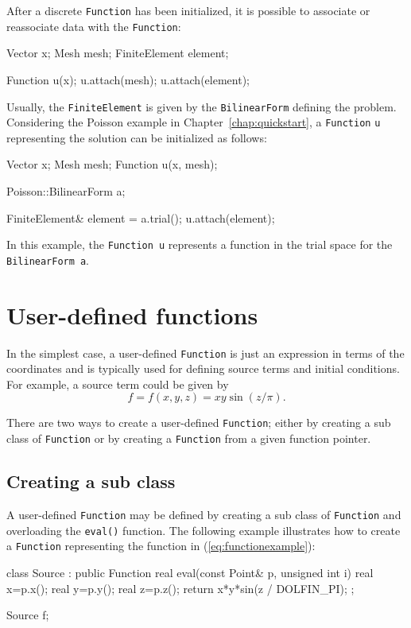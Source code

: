 After a discrete \texttt{Function} has been initialized, it is
possible to associate or reassociate data with the \texttt{Function}:
\begin{code}
Vector x;
Mesh mesh;
FiniteElement element;

Function u(x);
u.attach(mesh);
u.attach(element);
\end{code}

Usually, the \texttt{FiniteElement} is given by the
\texttt{BilinearForm} defining the problem. Considering the Poisson
example in Chapter~\ref{chap:quickstart}, a \texttt{Function}
\texttt{u} representing the solution can be initialized as follows:
\begin{code}
Vector x;
Mesh mesh;
Function u(x, mesh);

Poisson::BilinearForm a;

FiniteElement& element = a.trial();
u.attach(element); 
\end{code}
In this example, the \texttt{Function}~\texttt{u} represents a
function in the trial space for the \texttt{BilinearForm}~\texttt{a}.

\section{User-defined functions}

In the simplest case, a user-defined \texttt{Function} is just an
expression in terms of the coordinates and is typically used for
defining source terms and initial conditions. For example, a source
term could be given by
\begin{equation} \label{eq:functionexample}
  f = f(x, y, z) = xy \sin(z / \pi).
\end{equation}

There are two ways to create a user-defined \texttt{Function}; either
by creating a sub class of \texttt{Function} or by creating a
\texttt{Function} from a given function pointer.

\subsection{Creating a sub class}

A user-defined \texttt{Function} may be defined by creating a sub
class of \texttt{Function} and overloading the \texttt{eval()}
function.  The following example illustrates how to create a
\texttt{Function} representing the function in
(\ref{eq:functionexample}):
\begin{code}
class Source : public Function
{
  real eval(const Point& p, unsigned int i)
  { 
    real x=p.x();
    real y=p.y();
    real z=p.z();
    return x*y*sin(z / DOLFIN_PI);
  }
};

Source f;
\end{code}

